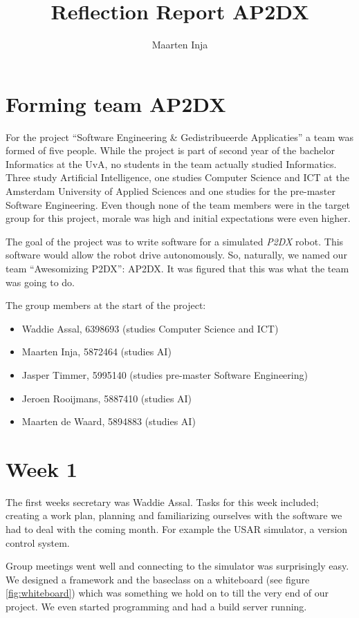 \documentclass[a4paper,10pt]{article}
\title{Reflection Report AP2DX}
\author{Maarten Inja}
\begin{document}
\maketitle

\section{Forming team AP2DX}
For the project ``Software Engineering \& Gedistribueerde Applicaties'' a team was formed of five people. 
While the project is part of second year of the bachelor Informatics at the UvA, no students in the 
team actually studied Informatics. Three study Artificial Intelligence, one studies 
Computer Science and ICT at the Amsterdam University of Applied Sciences and one studies for the 
pre-master Software Engineering. Even though none of the team members were in the target group for this
project, morale was high and initial expectations were even higher.

The goal of the project was to write software for a simulated \emph{P2DX} robot. This software would
allow the robot drive autonomously. So, naturally, we named our team ``Awesomizing P2DX'': AP2DX. It was
figured that this was what the team was going to do. 

The group members at the start of the project:
\begin{itemize}
    \item Waddie Assal, 6398693 (studies Computer Science and ICT) 
    \item Maarten Inja, 5872464 (studies AI)
    \item Jasper Timmer, 5995140 (studies pre-master Software Engineering)
    \item Jeroen Rooijmans, 5887410 (studies AI)
    \item Maarten de Waard, 5894883 (studies AI)
\end{itemize}

\section{Week 1}
The first weeks secretary was Waddie Assal. Tasks for this week included; creating a work plan, planning
and familiarizing ourselves with the software we had to deal with the coming month. For example the USAR simulator, 
a version control system. 

Group meetings went well and connecting to the simulator was surprisingly easy. We designed a framework and the
baseclass on a whiteboard (see figure \ref{fig:whiteboard}) which was something we hold on to till the very end
of our project. We even started programming and had a build server running.
\end{document}

